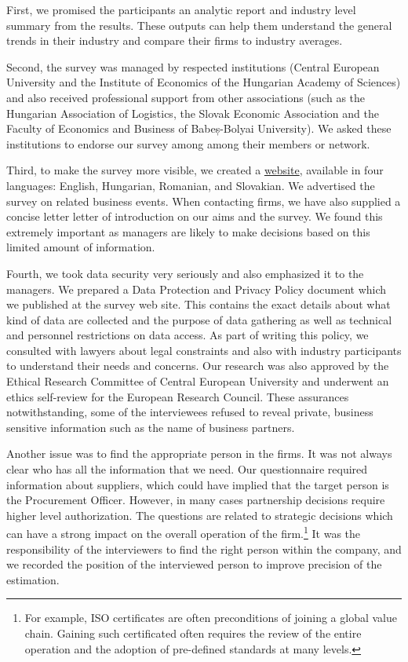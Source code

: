 \documentclass[final, dvipsnames, authoryear,12pt]{elsarticle}
\begin{document}
First, we promised the participants an analytic report and industry level summary from the results. These outputs can help them understand the general trends in their industry and compare their firms to industry averages.

Second, the survey was managed by respected institutions (Central European University and the Institute of Economics of the Hungarian Academy of Sciences) and also received professional support from other associations (such as the Hungarian Association of Logistics, the Slovak Economic Association and the Faculty of Economics and Business of Babeș-Bolyai University). We asked these institutions to endorse our survey among among their members or network. 

Third, to make the survey more visible, we created a \href{http://suppliersurvey.eu}{website}, available in four languages: English, Hungarian, Romanian, and Slovakian. We advertised the survey on related business events.
When contacting firms, we have also supplied a concise letter letter of introduction on our aims and the survey. We found this extremely important as managers are likely to make decisions based on this limited amount of information.

Fourth, we took data security very seriously and also emphasized it to the managers. We prepared a Data Protection and Privacy Policy document which we published at the survey web site. This contains the exact details about what kind of data are collected and the purpose of data gathering as well as  technical and personnel restrictions on data access. As part of writing this policy, we consulted with lawyers about legal constraints and also with industry participants to understand their needs and concerns. Our research was also approved by the Ethical Research Committee of Central European University and underwent an ethics self-review for the European Research Council. These assurances notwithstanding, some of the interviewees refused to reveal private, business sensitive information such as the name of business partners.    

Another issue was to find the appropriate person in the firms. It was not always clear who has all the information that we need. Our questionnaire required information about suppliers, which could have implied that the target person is the Procurement Officer. However, in many cases partnership decisions require higher level authorization. The questions are related to strategic decisions which can have a strong impact on the overall operation of the firm.\footnote{For example, ISO certificates are often preconditions of joining a global value chain. Gaining such certificated often requires the review of the entire operation and the adoption of pre-defined standards at many levels.} It was the responsibility of the interviewers to find the right person within the company, and we recorded the position of the interviewed person to improve precision of the estimation.
\end{document}
